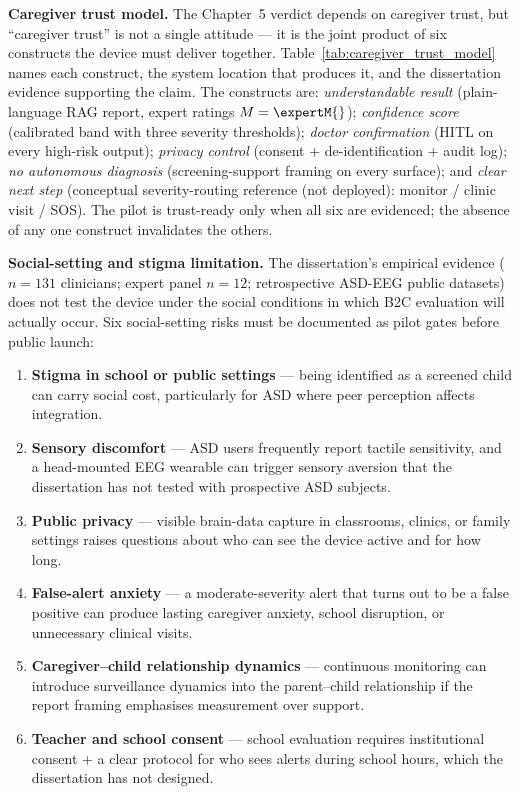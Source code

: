 

\noindent\textbf{Caregiver trust model.} The Chapter~5 verdict depends on caregiver trust, but ``caregiver trust'' is not a single attitude --- it is the joint product of six constructs the device must deliver together. Table~\ref{tab:caregiver_trust_model} names each construct, the system location that produces it, and the dissertation evidence supporting the claim. The constructs are: \emph{understandable result} (plain-language RAG report, expert ratings $M = \expertM{}$); \emph{confidence score} (calibrated band with three severity thresholds); \emph{doctor confirmation} (HITL on every high-risk output); \emph{privacy control} (consent + de-identification + audit log); \emph{no autonomous diagnosis} (screening-support framing on every surface); and \emph{clear next step} (conceptual severity-routing reference (not deployed): monitor / clinic visit / SOS). The pilot is trust-ready only when all six are evidenced; the absence of any one construct invalidates the others.



\noindent\textbf{Social-setting and stigma limitation.} The dissertation's empirical evidence ($n = 131$ clinicians; expert panel $n = 12$; retrospective ASD-EEG public datasets) does not test the device under the social conditions in which B2C evaluation will actually occur. Six social-setting risks must be documented as pilot gates before public launch:

\begin{enumerate}[leftmargin=*, itemsep=2pt, label=(\roman*)]
\item \textbf{Stigma in school or public settings} --- being identified as a screened child can carry social cost, particularly for ASD where peer perception affects integration.
\item \textbf{Sensory discomfort} --- ASD users frequently report tactile sensitivity, and a head-mounted EEG wearable can trigger sensory aversion that the dissertation has not tested with prospective ASD subjects.
\item \textbf{Public privacy} --- visible brain-data capture in classrooms, clinics, or family settings raises questions about who can see the device active and for how long.
\item \textbf{False-alert anxiety} --- a moderate-severity alert that turns out to be a false positive can produce lasting caregiver anxiety, school disruption, or unnecessary clinical visits.
\item \textbf{Caregiver--child relationship dynamics} --- continuous monitoring can introduce surveillance dynamics into the parent--child relationship if the report framing emphasises measurement over support.
\item \textbf{Teacher and school consent} --- school evaluation requires institutional consent + a clear protocol for who sees alerts during school hours, which the dissertation has not designed.
\end{enumerate}

